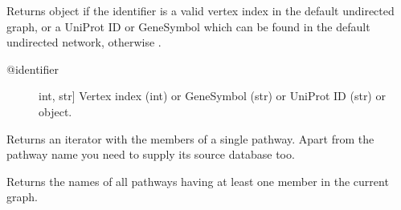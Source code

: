 \documentclass[letterpaper,10pt,english]{sphinxmanual}
\begin{document}
\begin{fulllineitems}
\begin{fulllineitems}
\label{\detokenize{main:pypath.main.PyPath.p}}
Returns  object if the identifier
is a valid vertex index in the default undirected graph,
or a UniProt ID or GeneSymbol which can be found in the
default undirected network, otherwise .
\begin{description}
\item[{@identifier}] \leavevmode{[}int, str{]}
Vertex index (int) or GeneSymbol (str) or UniProt ID (str) or
 object.

\end{description}

\end{fulllineitems}


\begin{fulllineitems}
\label{\detokenize{main:pypath.main.PyPath.pathway_attributes}}
\end{fulllineitems}


\begin{fulllineitems}
\label{\detokenize{main:pypath.main.PyPath.pathway_members}}
Returns an iterator with the members of a single pathway.
Apart from the pathway name you need to supply its source
database too.

\end{fulllineitems}


\begin{fulllineitems}
\label{\detokenize{main:pypath.main.PyPath.pathway_names}}
Returns the names of all pathways having at least one member
in the current graph.

\end{fulllineitems}



\end{fulllineitems}
\end{document}

